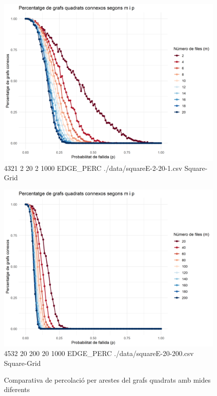 \documentclass[a4paper]{article}
\begin{document}
	\begin{figure}[H]
		\centering
		\begin{minipage}{0.45\textwidth}
			\centering
			\includegraphics[width=\textwidth]{images/squareE-2-20-1}
			\footnotesize{4321 2 20 2 1000 EDGE\_PERC ./data/squareE-2-20-1.csv Square-Grid}
		\end{minipage}
		\hfill
		\begin{minipage}{0.45\textwidth}
			\centering
			\includegraphics[width=\textwidth]{images/squareE-20-200}
			\footnotesize{4532 20 200 20 1000 EDGE\_PERC ./data/squareE-20-200.csv Square-Grid}
		\end{minipage}
		\caption{Comparativa de percolació per arestes del grafs quadrats amb mides diferents}
		\label{fig:percolation_edges_square}
	\end{figure}
	
\end{document}
